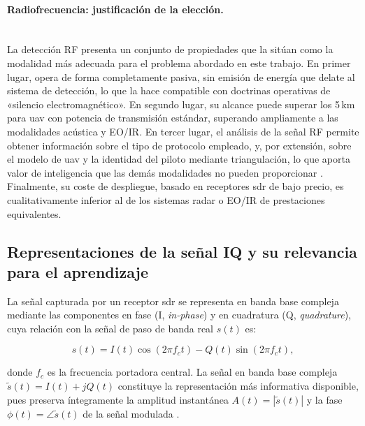\paragraph{Radiofrecuencia: justificación de la elección.}\mbox{}\\[0.5em]
La detección RF presenta un conjunto de propiedades que la sitúan como la modalidad
más adecuada para el problema abordado en este trabajo. En primer lugar, opera de
forma completamente pasiva, sin emisión de energía que delate al sistema de
detección, lo que la hace compatible con doctrinas operativas de «silencio
electromagnético». En segundo lugar, su alcance puede superar los 5\,km para \gls{uav}
con potencia de transmisión estándar, superando ampliamente a las modalidades acústica
y EO/IR. En tercer lugar, el análisis de la señal RF permite obtener información
sobre el tipo de protocolo empleado, y, por extensión, sobre el modelo de \gls{uav} y
la identidad del piloto mediante triangulación, lo que aporta valor de inteligencia
que las demás modalidades no pueden proporcionar \cite{ezuma_detection_2020,
alam_rf-enabled_2023}. Finalmente, su coste de despliegue, basado en receptores
\gls{sdr} de bajo precio, es cualitativamente inferior al de los sistemas radar o EO/IR
de prestaciones equivalentes.

\subsection{Representaciones de la señal IQ y su relevancia para el aprendizaje}
\label{subsec:representaciones_iq}

La señal capturada por un receptor \gls{sdr} se representa en banda base compleja
mediante las componentes en fase (I, \textit{in-phase}) y en cuadratura (Q,
\textit{quadrature}), cuya relación con la señal de paso de banda real $s(t)$ es:

\begin{equation}
 s(t) = I(t)\cos(2\pi f_c t) - Q(t)\sin(2\pi f_c t),
\end{equation}

donde $f_c$ es la frecuencia portadora central. La señal en banda base compleja
$\tilde{s}(t) = I(t) + jQ(t)$ constituye la representación más informativa
disponible, pues preserva íntegramente la amplitud instantánea $A(t) = |\tilde{s}(t)|$
y la fase $\phi(t) = \angle\tilde{s}(t)$ de la señal modulada
\cite{oppenheim_discrete_2014, valkama_blind_2005}.

